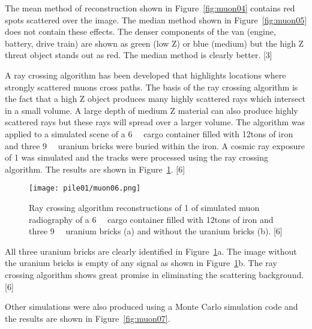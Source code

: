 \documentclass[twocolumn,a4paper]{article}
\begin{document}
The mean method of reconstruction shown in Figure~\ref{fig:muon04}
contains red spots scattered over the image.  The median method shown
in Figure~\ref{fig:muon05} does not contain these effects. The denser
components of the van (engine, battery, drive train) are shown as
green (low Z) or blue (medium) but the high Z threat object stands out
as red. The median method is clearly better. [3]

A ray crossing algorithm has been developed that highlights locations
where strongly scattered muons cross paths. The basis of the ray
crossing algorithm is the fact that a high Z object produces many
highly scattered rays which intersect in a small volume. A large depth
of medium Z material can also produce highly scattered rays but these
rays will spread over a larger volume. The algorithm was applied to a
simulated scene of a \unit{6}{\cubic\metre} cargo
container filled with \unit{12}{tons} of iron and three
\unit{9}{\cubic{\centi\metre}} uranium bricks were
buried within the iron. A cosmic ray exposure of \unit{1}{\minute} was
simulated and the tracks were processed using the ray crossing
algorithm. The results are shown in Figure~\ref{fig:muon06}. [6]

\begin{figure}
  \texttt{[image: pile01/muon06.png]}
  \caption{Ray crossing algorithm reconstructions of \unit{1}{\minute}
    of simulated muon radiography of a
    \unit{6}{\cubic\metre} cargo container filled
    with \unit{12}{tons} of iron and three
    \unit{9}{\cubic{\centi\metre}} uranium bricks (a)
    and without the uranium bricks (b). [6]}
  \label{fig:muon06}
\end{figure}

All three uranium bricks are clearly identified in
Figure~\ref{fig:muon06}a. The image without the uranium bricks is empty of
any signal as shown in Figure~\ref{fig:muon06}b. The ray crossing
algorithm shows great promise in eliminating the scattering
background. [6]

Other simulations were also produced using a Monte Carlo simulation
code and the results are shown in Figure~\ref{fig:muon07}.
\end{document}
